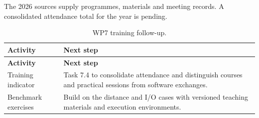The 2026 sources supply programmes, materials and meeting records.
A consolidated attendance total for the year is pending.

\begin{longtable}{@{}>{\raggedright\arraybackslash}p{}>{\raggedright\arraybackslash}p{}@{}}
\caption{WP7 training follow-up.}
\label{tab:v3-training-roadmap}\\
\toprule
\textbf{Activity} & \textbf{Next step}\\
\midrule
\endfirsthead
\toprule
\textbf{Activity} & \textbf{Next step}\\
\midrule
\endhead
Training indicator & Task 7.4 to consolidate attendance and distinguish courses and practical sessions from software exchanges.\\
Benchmark exercises & Build on the distance and I/O cases with versioned teaching materials and execution environments.\\
\bottomrule
\end{longtable}
